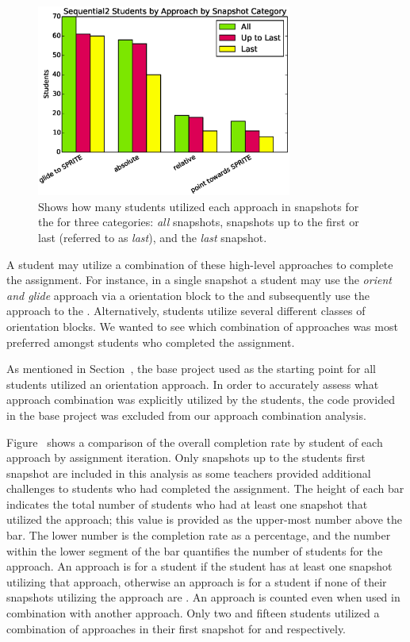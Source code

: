 \begin{figure}[!t]
\centering \includegraphics[width=3.3in]{graphs/approach_bar_Sequential2.eps}
\caption{Shows how many students utilized each approach in snapshots for the
  \stwo{} for three categories: \emph{all} snapshots, snapshots up to the first
  \com{} or last \incom{} (referred to as \emph{last}), and the \emph{last}
  snapshot.}
\end{figure}

A student may utilize a combination of these high-level approaches to complete
the assignment. For instance, in a single snapshot a student may use the
\emph{orient and glide} approach via a \rel{} orientation block to \catch{} the
\bear{} and subsequently use the \glideto{} approach to \catch{} the
\horse{}. Alternatively, students utilize several different classes of
orientation blocks. We wanted to see which combination of approaches was most
preferred amongst students who completed the assignment.

As mentioned in Section~, the base project used as the
starting point for all students utilized an \abs{} orientation approach. In
order to accurately assess what approach combination was explicitly utilized by
the students, the code provided in the base project was excluded from our
approach combination analysis.

Figure~ shows a comparison of the
overall completion rate by student of each approach by assignment
iteration. Only snapshots up to the students first \com{} snapshot are included
in this analysis as some teachers provided additional challenges to students
who had completed the assignment. The height of each bar indicates the total
number of students who had at least one snapshot that utilized the approach;
this value is provided as the upper-most number above the bar. The lower number
is the completion rate as a percentage, and the number within the lower segment
of the bar quantifies the number of \com{} students for the approach. An
approach is \com{} for a student if the student has at least one \com{}
snapshot utilizing that approach, otherwise an approach is \incom{} for a
student if none of their snapshots utilizing the approach are \com{}. An
approach is counted even when used in combination with another approach. Only
two and fifteen students utilized a combination of approaches in their first
\com{} snapshot for \sone{} and \stwo{} respectively.

